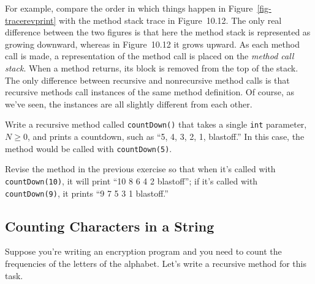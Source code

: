 
\noindent For example, compare the order in which things happen in
Figure~\ref{fig-tracerevprint} with the method stack trace in
Figure~10.12. The only real difference between the two
figures is that here the method stack is represented as growing
downward, whereas in Figure~10.12 it grows upward.
As each method call is made, a representation of the method call is
placed on the {\em method call stack}. 
When a method returns, its
block is removed from the top of the stack.  The only difference
between recursive and nonrecursive method calls is that recursive
methods call instances of the same method definition.   Of course, as
we've seen, the instances are all slightly different from each other.


\begin{SSTUDY}

\item  Write a recursive method called {\tt countDown()} that takes
a single {\tt int} parameter, $N \geq 0$, and prints a countdown,
such as ``5, 4, 3, 2, 1, blastoff.'' In this case, the
method would be called with {\tt countDown(5)}.


\item  Revise the method in the previous exercise so that when it's
called with {\tt countDown(10)}, it will print ``10 8 6 4 2 blastoff'';
if it's called with {\tt countDown(9)}, it prints ``9 7 5 3 1 blastoff.''

\end{SSTUDY}

\subsection{Counting Characters in a String}
\noindent Suppose you're writing an encryption program and you need to count the
frequencies of the letters of the alphabet.  Let's write a recursive
method for this task.

